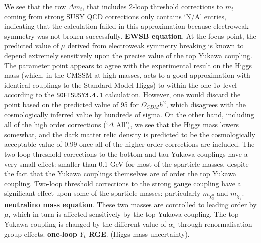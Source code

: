 \documentclass[final,3p,times,pdflatex]{elsarticle}
\begin{document}
We see that the row $\Delta m_t$, that includes 2-loop threshold corrections
to $m_t$ coming from strong SUSY QCD corrections only contains `N/A' entries,
indicating that the calculation failed in this approximation because
electroweak symmetry was not broken successfully. {\bf EWSB equation}.
At the focus point,
the predicted value of $\mu$ derived from electroweak symmetry breaking is
known to 
depend extremely sensitively upon the precise value of the top Yukawa
coupling. 
The parameter point appears to agree with the experimental result on the Higgs
mass (which, in the CMSSM at high masses, acts to a good approximation with
identical couplings to the Standard Model Higgs)
to within the one 1$\sigma$ level according to the {\tt SOFTSUSY3.4.1}
calculation. However, one would discard the point based on the predicted value
of 95 for $\Omega_{CDM} h^2$, which disagrees with the cosmologically inferred
value by hundreds of sigma. On the other hand, including all of the high order
corrections (`$\Delta$ All'), we see that the Higgs mass lowers somewhat, and
the dark matter 
relic density is predicted to be the cosmologically acceptable value of 0.99
once all of the higher order corrections are included.
The two-loop threshold corrections to the bottom and tau Yukawa couplings 
have a very small effect: smaller than 0.1 GeV for most of the sparticle
masses, despite the fact that the Yukawa couplings themselves are of order the
top Yukawa coupling. 
Two-loop threshold corrections to the strong gauge coupling have a significant
effect upon some of the sparticle masses: particularly $m_{\chi_3^0}$ and
$m_{\chi_4^0}$. {\bf neutralino mass equation}.
These two masses are controlled to leading order by $\mu$,
which in turn is affected sensitively by the top Yukawa coupling. 
The top Yukawa coupling is changed by the different value of $\alpha_s$
through renormalisation group effects. {\bf one-loop $Y_t$ RGE}.
(Higgs mass uncertainty).
\end{document}
